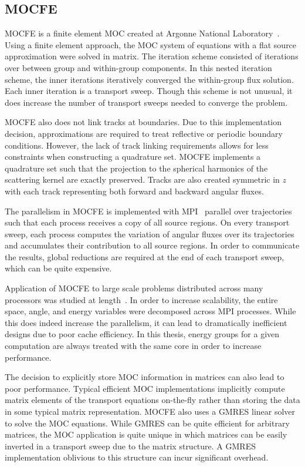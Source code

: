 \subsection{MOCFE}
\label{sec:mocfe}

MOCFE is a finite element \ac{MOC} created at Argonne National Laboratory~\cite{mocfe_init}. Using a finite element approach, the \ac{MOC} system of equations with a flat source approximation were solved in matrix. The iteration scheme consisted of iterations over between group and within-group components. In this nested iteration scheme, the inner iterations iteratively converged the within-group flux solution. Each inner iteration is a transport sweep. Though this scheme is not unusual, it does increase the number of transport sweeps needed to converge the problem.

MOCFE also does not link tracks at boundaries. Due to this implementation decision, approximations are required to treat reflective or periodic boundary conditions. However, the lack of track linking requirements allows for less constraints when constructing a quadrature set. MOCFE implements a quadrature set such that the projection to the spherical harmonics of the scattering kernel are exactly preserved. Tracks are also created symmetric in $z$ with each track representing both forward and backward angular fluxes.

The parallelism in MOCFE is implemented with \ac{MPI}~\cite{mpi} parallel over trajectories such that each process receives a copy of all source regions. On every transport sweep, each process computes the variation of angular fluxes over its trajectories and accumulates their contribution to all source regions. In order to communicate the results, global reductions are required at the end of each transport sweep, which can be quite expensive.

Application of MOCFE to large scale problems distributed across many processors was studied at length~\cite{mocfe_bgp}. In order to increase scalability, the entire space, angle, and energy variables were decomposed across \ac{MPI} processes. While this does indeed increase the parallelism, it can lead to dramatically inefficient designs due to poor cache efficiency. In this thesis, energy groups for a given computation are always treated with the same core in order to increase performance.

The decision to explicitly store \ac{MOC} information in matrices can also lead to poor performance. Typical efficient \ac{MOC} implementations implicitly compute matrix elements of the transport equations on-the-fly rather than storing the data in some typical matrix representation.  MOCFE also uses a \ac{GMRES} linear solver to solve the \ac{MOC} equations. While \ac{GMRES} can be quite efficient for arbitrary matrices, the  \ac{MOC} application is quite unique in which matrices can be easily inverted in a transport sweep due to the matrix structure. A \ac{GMRES} implementation oblivious to this structure can incur significant overhead.


